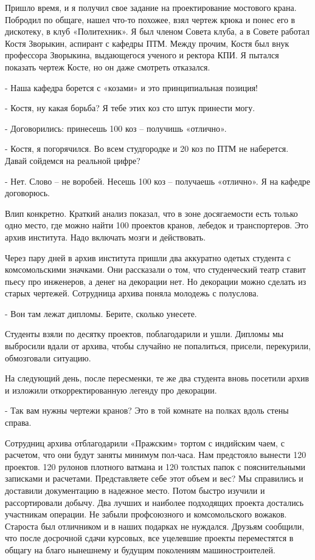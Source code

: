 Пришло время, и я получил свое задание на проектирование мостового крана.
Побродил по общаге, нашел что-то похожее, взял чертеж крюка и понес его в
дискотеку, в клуб «Политехник». Я был членом Совета клуба, а в Совете работал
Костя Зворыкин, аспирант с кафедры ПТМ. Между прочим, Костя был внук профессора
Зворыкина, выдающегося ученого и ректора КПИ. Я пытался показать чертеж Косте,
но он даже смотреть отказался.

- Наша кафедра борется с «козами» и это принципиальная позиция!

- Костя, ну какая борьба? Я тебе этих коз сто штук принести могу.

- Договорились: принесешь 100 коз – получишь «отлично».

- Костя, я погорячился. Во всем студгородке и 20 коз по ПТМ не наберется. Давай
сойдемся на реальной цифре?

- Нет. Слово – не воробей. Несешь 100 коз – получаешь «отлично». Я на кафедре
договорюсь.

Влип конкретно. Краткий анализ показал, что в зоне досягаемости есть только
одно место, где можно найти 100 проектов кранов, лебедок и транспортеров. Это
архив института. Надо включать мозги и действовать.

Через пару дней в архив института пришли два аккуратно одетых студента с
комсомольскими значками. Они рассказали о том, что студенческий театр ставит
пьесу про инженеров, а денег на декорации нет. Но декорации можно сделать из
старых чертежей. Сотрудница архива поняла молодежь с полуслова.

- Вон там лежат дипломы. Берите, сколько унесете.

Студенты взяли по десятку проектов, поблагодарили и ушли. Дипломы мы выбросили
вдали от архива, чтобы случайно не попалиться, присели, перекурили, обмозговали
ситуацию.

На следующий день, после пересменки, те же два студента вновь посетили архив и
изложили откорректированную легенду про декорации.

- Так вам нужны чертежи кранов? Это в той комнате на полках вдоль стены справа.

Сотрудниц архива отблагодарили «Пражским» тортом с индийским чаем, с расчетом,
что они будут заняты минимум пол-часа. Нам предстояло вынести 120 проектов. 120
рулонов плотного ватмана и 120 толстых папок с пояснительными записками и
расчетами. Представляете себе этот объем и вес? Мы справились и доставили
документацию в надежное место. Потом быстро изучили и рассортировали добычу.
Два лучших и наиболее подходящих проекта достались участникам операции. Не
забыли профсоюзного и комсомольского вожаков. Староста был отличником и в наших
подарках не нуждался. Друзьям сообщили, что после досрочной сдачи курсовых, все
уцелевшие проекты переместятся в общагу на благо нынешнему и будущим поколениям
машиностроителей.

